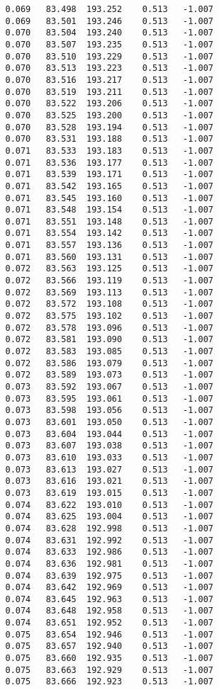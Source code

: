 \begin{verbatim}
   0.069   83.498  193.252    0.513   -1.007
   0.069   83.501  193.246    0.513   -1.007
   0.070   83.504  193.240    0.513   -1.007
   0.070   83.507  193.235    0.513   -1.007
   0.070   83.510  193.229    0.513   -1.007
   0.070   83.513  193.223    0.513   -1.007
   0.070   83.516  193.217    0.513   -1.007
   0.070   83.519  193.211    0.513   -1.007
   0.070   83.522  193.206    0.513   -1.007
   0.070   83.525  193.200    0.513   -1.007
   0.070   83.528  193.194    0.513   -1.007
   0.070   83.531  193.188    0.513   -1.007
   0.071   83.533  193.183    0.513   -1.007
   0.071   83.536  193.177    0.513   -1.007
   0.071   83.539  193.171    0.513   -1.007
   0.071   83.542  193.165    0.513   -1.007
   0.071   83.545  193.160    0.513   -1.007
   0.071   83.548  193.154    0.513   -1.007
   0.071   83.551  193.148    0.513   -1.007
   0.071   83.554  193.142    0.513   -1.007
   0.071   83.557  193.136    0.513   -1.007
   0.071   83.560  193.131    0.513   -1.007
   0.072   83.563  193.125    0.513   -1.007
   0.072   83.566  193.119    0.513   -1.007
   0.072   83.569  193.113    0.513   -1.007
   0.072   83.572  193.108    0.513   -1.007
   0.072   83.575  193.102    0.513   -1.007
   0.072   83.578  193.096    0.513   -1.007
   0.072   83.581  193.090    0.513   -1.007
   0.072   83.583  193.085    0.513   -1.007
   0.072   83.586  193.079    0.513   -1.007
   0.072   83.589  193.073    0.513   -1.007
   0.073   83.592  193.067    0.513   -1.007
   0.073   83.595  193.061    0.513   -1.007
   0.073   83.598  193.056    0.513   -1.007
   0.073   83.601  193.050    0.513   -1.007
   0.073   83.604  193.044    0.513   -1.007
   0.073   83.607  193.038    0.513   -1.007
   0.073   83.610  193.033    0.513   -1.007
   0.073   83.613  193.027    0.513   -1.007
   0.073   83.616  193.021    0.513   -1.007
   0.073   83.619  193.015    0.513   -1.007
   0.074   83.622  193.010    0.513   -1.007
   0.074   83.625  193.004    0.513   -1.007
   0.074   83.628  192.998    0.513   -1.007
   0.074   83.631  192.992    0.513   -1.007
   0.074   83.633  192.986    0.513   -1.007
   0.074   83.636  192.981    0.513   -1.007
   0.074   83.639  192.975    0.513   -1.007
   0.074   83.642  192.969    0.513   -1.007
   0.074   83.645  192.963    0.513   -1.007
   0.074   83.648  192.958    0.513   -1.007
   0.074   83.651  192.952    0.513   -1.007
   0.075   83.654  192.946    0.513   -1.007
   0.075   83.657  192.940    0.513   -1.007
   0.075   83.660  192.935    0.513   -1.007
   0.075   83.663  192.929    0.513   -1.007
   0.075   83.666  192.923    0.513   -1.007

\end{verbatim}
